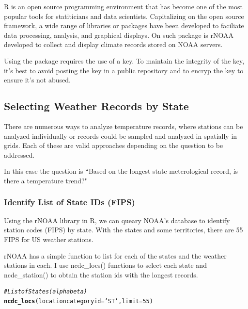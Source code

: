 \documentclass{article}\usepackage[]{graphicx}\usepackage[]{color}
\makeatletter
\newcommand{\hlnum}[1]{\textcolor[rgb]{0.686,0.059,0.569}{#1}}%
\newcommand{\hlstr}[1]{\textcolor[rgb]{0.192,0.494,0.8}{#1}}%
\newcommand{\hlcom}[1]{\textcolor[rgb]{0.678,0.584,0.686}{\textit{#1}}}%
\newcommand{\hlstd}[1]{\textcolor[rgb]{0.345,0.345,0.345}{#1}}%
\newcommand{\hlkwc}[1]{\textcolor[rgb]{0.333,0.667,0.333}{#1}}%
\newcommand{\hlkwd}[1]{\textcolor[rgb]{0.737,0.353,0.396}{\textbf{#1}}}%
\newenvironment{kframe}{%
 \def\at@end@of@kframe{}%
 \ifinner\ifhmode%
  \def\at@end@of@kframe{\end{minipage}}%
  \begin{minipage}{\columnwidth}%
 \fi\fi%
 \def\FrameCommand##1{\hskip\@totalleftmargin \hskip-\fboxsep
 \colorbox{shadecolor}{##1}\hskip-\fboxsep
     \hskip-\linewidth \hskip-\@totalleftmargin \hskip\columnwidth}%
 \MakeFramed {\advance\hsize-\width
   \@totalleftmargin\z@ \linewidth\hsize
   \@setminipage}}%
 {\par\unskip\endMakeFramed%
 \at@end@of@kframe}
\newenvironment{knitrout}{}{} %
\makeatother
\begin{document}
R is an open source programming environment that has become one of the most popular tools for statiticians and data scientists. Capitalizing on the open source framework, a wide range of libraries or packages have been developed to faciliate data processing, analysis, and graphical displays. On such package is rNOAA developed to collect and display climate records stored on NOAA servers.

Using the package requires the use of a key. To maintain the integrity of the key, it's best to avoid posting the key in a public repository and to encryp the key to ensure it's not abused. 

\subsection{Selecting Weather Records by State}

There are numerous ways to analyze temperature records, where stations can be analyzed individually or records could be sampled and analyzed in spatially in grids. Each of these are valid approaches depending on the question to be addressed. 

In this case the question is ``Based on the longest state meterological record, is there a temperature trend?"

\subsubsection{Identify List of State IDs (FIPS)}

Using the rNOAA library in R, we can queary NOAA's database to identify station codes (FIPS) by state. With the states and some territories, there are 55 FIPS for US weather stations. 

rNOAA has a simple function to list for each of the states and the weather stations in each. I use ncdc\_locs() functions to select each state and ncdc\_station() to obtain the station ids with the longest records. 

\begin{knitrout}
\color{fgcolor}\begin{kframe}
\begin{alltt}
\hlcom{# List of States (alpha beta)}
\hlkwd{ncdc_locs}\hlstd{(}\hlkwc{locationcategoryid}\hlstd{=}\hlstr{'ST'}\hlstd{,} \hlkwc{limit}\hlstd{=}\hlnum{55}\hlstd{)}
\end{alltt}
\end{kframe}
\end{knitrout}
\end{document}
